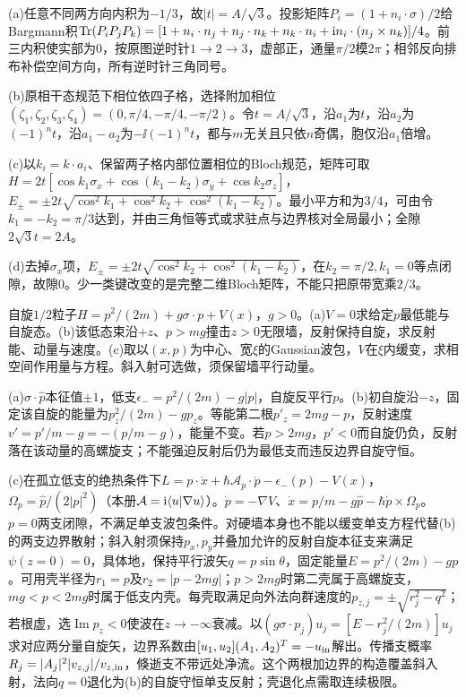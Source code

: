 \begin{solution}
(a)任意不同两方向内积为$-1/3$，故$|t|=A/\sqrt3$。投影矩阵$P_i=(1+n_i\cdot\sigma)/2$给Bargmann积$\operatorname{Tr}(P_iP_jP_k)=[1+n_i\cdot n_j+n_j\cdot n_k+n_k\cdot n_i+\mathrm i n_i\cdot(n_j\times n_k)]/4$。前三内积使实部为0，按原图逆时针$1\to2\to3$，虚部正，通量$\pi/2$模$2\pi$；相邻反向排布补偿空间方向，所有逆时针三角同号。

(b)原相干态规范下相位依四子格，选择附加相位$(\zeta_1,\zeta_2,\zeta_3,\zeta_4)=(0,\pi/4,-\pi/4,-\pi/2)$。令$t=A/\sqrt3$，沿$a_1$为$t$，沿$a_2$为$(-1)^nt$，沿$a_1-a_2$为$-\ii(-1)^nt$，都与$m$无关且只依$n$奇偶，胞仅沿$a_1$倍增。

(c)以$k_i=k\cdot a_i$、保留两子格内部位置相位的Bloch规范，矩阵可取$H=2t[\cos k_1\sigma_x+\cos(k_1-k_2)\sigma_y+\cos k_2\sigma_z]$，$E_\pm=\pm2t\sqrt{\cos^2k_1+\cos^2k_2+\cos^2(k_1-k_2)}$。最小平方和为$3/4$，可由令$k_1=-k_2=\pi/3$达到，并由三角恒等式或求驻点与边界核对全局最小；全隙$2\sqrt3t=2A$。

(d)去掉$\sigma_x$项，$E_\pm=\pm2t\sqrt{\cos^2k_2+\cos^2(k_1-k_2)}$，在$k_2=\pi/2,k_1=0$等点闭隙，故隙0。少一类键改变的是完整二维Bloch矩阵，不能只把原带宽乘$2/3$。
\end{solution}
\begin{exercise}[原题1(a)--(c)，斜入射选做]
自旋$1/2$粒子$H=p^2/(2m)+g\sigma\cdot p+V(x)$，$g>0$。(a)$V=0$求给定$p$最低能与自旋态。(b)该低态束沿$+z$、$p>mg$撞击$z>0$无限墙，反射保持自旋，求反射能、动量与速度。(c)取以$(x,p)$为中心、宽$\xi$的Gaussian波包，$V$在$\xi$内缓变，求相空间作用量与方程。斜入射可选做，须保留墙平行动量。
\end{exercise}
\begin{solution}
(a)$\sigma\cdot\hat p$本征值$\pm1$，低支$\epsilon_-=p^2/(2m)-g|p|$，自旋反平行$p$。(b)初自旋沿$-z$，固定该自旋的能量为$p_z^2/(2m)-gp_z$。等能第二根$p'_z=2mg-p$，反射速度$v'=p'/m-g=-(p/m-g)$，能量不变。若$p>2mg$，$p'<0$而自旋仍负，反射落在该动量的高螺旋支；不能强迫反射后仍为最低支而违反边界自旋守恒。

(c)在孤立低支的绝热条件下$L=p\cdot\dot x+\hbar\mathcal A_p\cdot\dot p-\epsilon_-(p)-V(x)$，$\Omega_p=\hat p/(2|p|^2)$（本册$\mathcal A=\mathrm i\langle u|\nabla u\rangle$）。$\dot p=-\nabla V$、$\dot x=p/m-g\hat p-\hbar\dot p\times\Omega_p$。$p=0$两支闭隙，不满足单支波包条件。对硬墙本身也不能以缓变单支方程代替(b)的两支边界散射；斜入射须保持$p_x,p_y$并叠加允许的反射自旋本征支来满足$\psi(z=0)=0$，具体地，保持平行波矢$q=p\sin\theta$，固定能量$E=p^2/(2m)-gp$。可用壳半径为$r_1=p$及$r_2=|p-2mg|$；$p>2mg$时第二壳属于高螺旋支，$mg<p<2mg$时属于低支内壳。每壳取满足向外法向群速度的$p_{z,j}=\pm\sqrt{r_j^2-q^2}$；若根虚，选$\operatorname{Im}p_z<0$使波在$z\to-\infty$衰减。以$(g\sigma\cdot p_j)u_j=[E-r_j^2/(2m)]u_j$求对应两分量自旋矢，边界系数由$[u_1,u_2](A_1,A_2)^T=-u_{\rm in}$解出。传播支概率$R_j=|A_j|^2|v_{z,j}|/v_{z,\rm in}$，倏逝支不带远处净流。这个两根加边界的构造覆盖斜入射，法向$q=0$退化为(b)的自旋守恒单支反射；壳退化点需取连续极限。
\end{solution}
